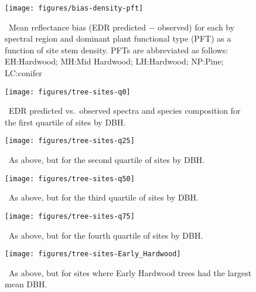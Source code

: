 \clearpage

\begin{figure}
  \centering
  \texttt{[image: figures/bias-density-pft]}
  \caption{\label{fig:bias-density-pft}\
    Mean reflectance bias (EDR predicted $-$ observed) for each by spectral region and dominant plant functional type (PFT) as a function of site stem density.
    PFTs are abbreviated as follows:
    EH:\@Early Hardwood;
    MH:\@North Mid Hardwood;
    LH:\@Late Hardwood;
    NP:\@Northern Pine;
    LC:\@Late conifer
  }
\end{figure}

\clearpage

\begin{figure}[ht]
  \centering
  \texttt{[image: figures/tree-sites-q0]}
  \caption{\label{fig:tree-sites-q0}\
    EDR predicted vs.\ observed spectra and species composition for the first quartile of sites by DBH.\@
  }
\end{figure}

\clearpage

\begin{figure}[ht]
  \centering
  \texttt{[image: figures/tree-sites-q25]}
  \caption{\label{fig:tree-sites-q25}\
    As above, but for the second quartile of sites by DBH.\@
  }
\end{figure}

\clearpage

\begin{figure}[ht]
  \centering
  \texttt{[image: figures/tree-sites-q50]}
  \caption{\label{fig:tree-sites-q50}\
    As above, but for the third quartile of sites by DBH.\@
  }
\end{figure}

\clearpage

\begin{figure}[ht]
  \centering
  \texttt{[image: figures/tree-sites-q75]}
  \caption{\label{fig:tree-sites-q75}\
    As above, but for the fourth quartile of sites by DBH.\@
  }
\end{figure}

\clearpage

\begin{figure}[ht]
  \centering
  \texttt{[image: figures/tree-sites-Early\_Hardwood]}
  \caption{\label{fig:tree-sites-EH}\
    As above, but for sites where Early Hardwood trees had the largest mean DBH.\@
  }
\end{figure}


